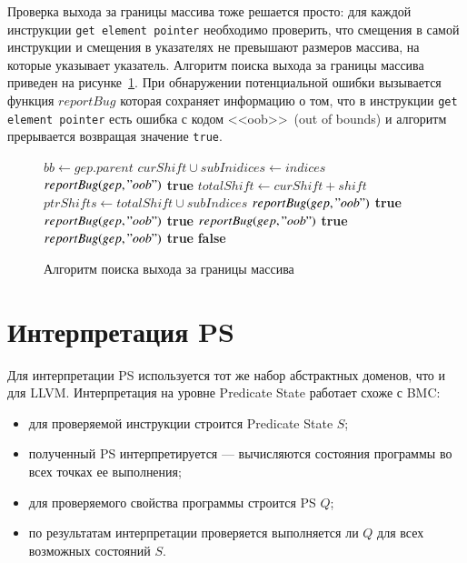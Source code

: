 Проверка выхода за границы массива тоже решается просто: для каждой инструкции
\texttt{get element pointer} необходимо проверить, что смещения в самой инструкции и смещения в 
указателях не превышают размеров массива, на которые указывает указатель. 
Алгоритм поиска выхода за границы массива приведен на 
рисунке~\ref{image:oobChecker}. При обнаружении потенциальной ошибки вызывается
функция $reportBug$ которая сохраняет информацию о том, что в инструкции 
\texttt{get element pointer} есть ошибка с кодом <<oob>>~(out of bounds) и алгоритм 
прерывается возвращая значение \texttt{true}.
\begin{figure}[h!]
\begin{algorithmic}[1]
\State $bb \gets gep.parent$
\State $curShift \cup subInidices \gets indices$
    \State $reportBug(gep, "oob")$
    \State \Return \textbf{true}
            \State $totalShift \gets curShift + shift$
            \State $ptrShifts \gets totalShift \cup subIndices$
                \State $reportBug(gep, "oob")$
                \State \Return \textbf{true}
            \EndIf
        \EndFor
    \EndFor
{}
        \State $reportBug(gep, "oob")$
        \State \Return \textbf{true}
    \EndIf
        \State $reportBug(gep, "oob")$
        \State \Return \textbf{true}
    \EndIf
            \State $reportBug(gep, "oob")$
            \State \Return \textbf{true}
        \EndIf
    \EndFor
\EndIf
\State \Return \textbf{false}    
\EndFunction
\end{algorithmic}
\caption{Алгоритм поиска выхода за границы массива}
\label{image:oobChecker}
\end{figure}

\section{Интерпретация PS}
Для интерпретации PS используется тот же набор абстрактных доменов, что и для 
LLVM. Интерпретация на уровне Predicate State работает схоже с BMC:
\begin{itemize}
\item для проверяемой инструкции строится Predicate State $S$;
\item полученный PS интерпретируется --- вычисляются состояния программы
во всех точках ее выполнения;
\item для проверяемого свойства программы строится PS $Q$;
\item по результатам интерпретации проверяется выполняется ли $Q$ для всех 
возможных состояний $S$.
\end{itemize}

